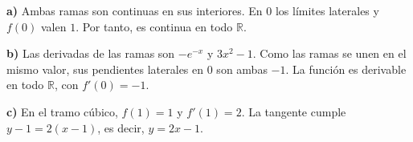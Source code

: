 \textbf{a)} Ambas ramas son continuas en sus interiores. En $0$ los límites laterales y $f(0)$ valen $1$. Por tanto, es continua en todo $\mathbb R$.

\textbf{b)} Las derivadas de las ramas son $-e^{-x}$ y $3x^2-1$. Como las ramas se unen en el mismo valor, sus pendientes laterales en $0$ son ambas $-1$. La función es derivable en todo $\mathbb R$, con $f'(0)=-1$.

\textbf{c)} En el tramo cúbico, $f(1)=1$ y $f'(1)=2$. La tangente cumple $y-1=2(x-1)$, es decir, $\boxed{y=2x-1}$.
